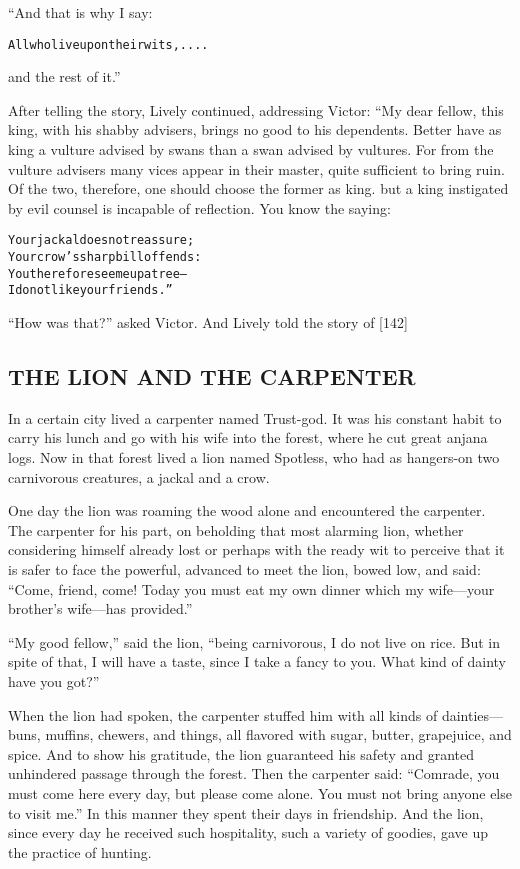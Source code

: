 \documentclass{article}
\renewenvironment{verbatim}{\begin{alltt}\normalfont\begin{centering}}{\end{centering}\end{alltt}}
\begin{document}
“And that is why I say:

\begin{verbatim}
All who live upon their wits,....
\end{verbatim}
and the rest of it.”

After telling the story, Lively continued, addressing Victor: “My
dear fellow, this king, with his shabby advisers, brings no good to
his dependents. Better have as king a vulture advised by swans than
a swan advised by vultures. For from the vulture advisers many
vices appear in their master, quite sufficient to bring ruin. Of
the two, therefore, one should choose the former as king. but a
king instigated by evil counsel is incapable of reflection. You
know the saying:

\begin{verbatim}
Your jackal does not reassure;
    Your crow's sharp bill offends:
You therefore see me up a tree--
    I do not like your friends.”
\end{verbatim}
``How was that?'' asked Victor. And Lively told the story of [142]

\subsection{THE LION AND THE CARPENTER}

In a certain city lived a carpenter named Trust-god. It was his
constant habit to carry his lunch and go with his wife into the
forest, where he cut great anjana logs. Now in that forest lived a
lion named Spotless, who had as hangers-on two carnivorous
creatures, a jackal and a crow.

One day the lion was roaming the wood alone and encountered the
carpenter. The carpenter for his part, on beholding that most
alarming lion, whether considering himself already lost or perhaps
with the ready wit to perceive that it is safer to face the
powerful, advanced to meet the lion, bowed low, and said:
``Come, friend, come! Today you must eat my own dinner which my wife---your brother's wife---has provided.''

``My good fellow,'' said the lion,
``being carnivorous, I do not live on rice. But in spite of that, I will have a taste, since I take a fancy to you. What kind of dainty have you got?''

When the lion had spoken, the carpenter stuffed him with all kinds
of dainties---buns, muffins, chewers, and things, all flavored with
sugar, butter, grapejuice, and spice. And to show his gratitude,
the lion guaranteed his safety and granted unhindered passage
through the forest. Then the carpenter said:
``Comrade, you must come here every day, but please come alone. You must not bring anyone else to visit me.''
In this manner they spent their days in friendship. And the lion,
since every day he received such hospitality, such a variety of
goodies, gave up the practice of hunting.
\end{document}
